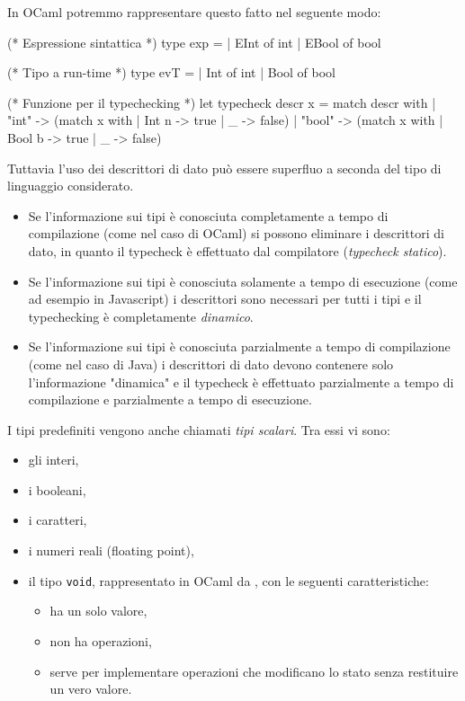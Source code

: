 In OCaml potremmo rappresentare questo fatto nel seguente modo:
\begin{OCaml}
    (* Espressione sintattica *)
    type exp =
        | EInt of int
        | EBool of bool
    
    (* Tipo a run-time *)
    type evT =
        | Int of int
        | Bool of bool

    (* Funzione per il typechecking *)
    let typecheck descr x = 
        match descr with
        | "int" -> (match x with
                    | Int n -> true
                    | _     -> false)
        | "bool" -> (match x with
                     | Bool b -> true
                     | _      -> false)
\end{OCaml}

Tuttavia l'uso dei descrittori di dato può essere superfluo a seconda del tipo di linguaggio considerato.
\begin{itemize}
    \item Se l'informazione sui tipi è conosciuta completamente a tempo di compilazione (come nel caso di OCaml) si possono eliminare i descrittori di dato, in quanto il typecheck è effettuato dal compilatore (\emph{typecheck statico}).
    \item Se l'informazione sui tipi è conosciuta solamente a tempo di esecuzione (come ad esempio in Javascript) i descrittori sono necessari per tutti i tipi e il typechecking è completamente \emph{dinamico}.
    \item Se l'informazione sui tipi è conosciuta parzialmente a tempo di compilazione (come nel caso di Java) i descrittori di dato devono contenere solo l'informazione "dinamica" e il typecheck è effettuato parzialmente a tempo di compilazione e parzialmente a tempo di esecuzione.
\end{itemize}

I tipi predefiniti vengono anche chiamati \emph{tipi scalari}. Tra essi vi sono:
\begin{itemize}
    \item gli interi,
    \item i booleani,
    \item i caratteri,
    \item i numeri reali (floating point),
    \item il tipo \texttt{void}, rappresentato in OCaml da \InlineOCaml{()}, con le seguenti caratteristiche:
    \begin{itemize}
        \item ha un solo valore,
        \item non ha operazioni,
        \item serve per implementare operazioni che modificano lo stato senza restituire un vero valore.
    \end{itemize}
\end{itemize}

